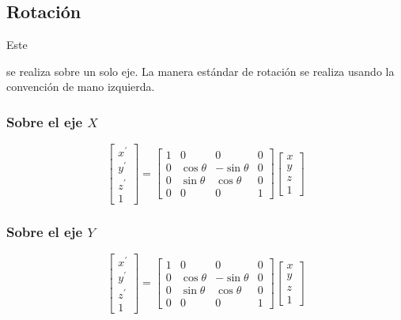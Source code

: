 \documentclass[stu, 12pt, letterpaper, donotrepeattitle, floatsintext, natbib]{apa7}
\begin{document}
    \subsection{Rotación}
    Este \begin{justifying}
        se realiza sobre un solo eje. La manera estándar de rotación se realiza usando la convención de mano izquierda.\par
    \end{justifying}
    \subsubsection{Sobre el eje \(X\)}
    \begin{equation*}
        \begin{bmatrix}
            x^{\prime}\\
            y^{\prime}\\
            z^{\prime}\\
            1
        \end{bmatrix}=
        \begin{bmatrix}
            1&0&0&0\\
            0&\cos \theta&-\sin \theta&0\\
            0&\sin \theta&\cos \theta&0\\
            0&0&0&1
        \end{bmatrix}
        \begin{bmatrix}
            x\\
            y\\
            z\\
            1
        \end{bmatrix}
    \end{equation*}
    \vspace{\baselineskip}
    \subsubsection{Sobre el eje \(Y\)}
    \begin{equation*}
        \begin{bmatrix}
            x^{\prime}\\
            y^{\prime}\\
            z^{\prime}\\
            1
        \end{bmatrix}=
        \begin{bmatrix}
            1&0&0&0\\
            0&\cos \theta&-\sin \theta&0\\
            0&\sin \theta&\cos \theta&0\\
            0&0&0&1 
        \end{bmatrix}
        \begin{bmatrix}
            x\\
            y\\
            z\\
            1
        \end{bmatrix}
    \end{equation*}
    \vspace{\baselineskip}
\end{document}

